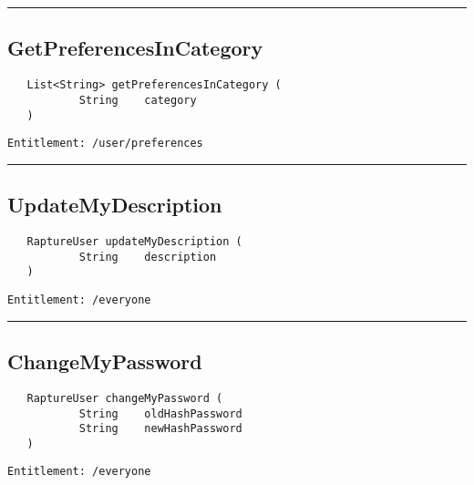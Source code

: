 \rule{12cm}{2pt}
\subsection{GetPreferencesInCategory}
\label{Api:GetPreferencesInCategory}
\begin{verbatim}
   List<String> getPreferencesInCategory (
           String    category
   )
\end{verbatim}
\begin{Verbatim}[fontsize=\small, formatcom=\color{Maroon}]
  Entitlement: /user/preferences
\end{Verbatim}



\rule{12cm}{2pt}
\subsection{UpdateMyDescription}
\label{Api:UpdateMyDescription}
\begin{verbatim}
   RaptureUser updateMyDescription (
           String    description
   )
\end{verbatim}
\begin{Verbatim}[fontsize=\small, formatcom=\color{Maroon}]
  Entitlement: /everyone
\end{Verbatim}



\rule{12cm}{2pt}
\subsection{ChangeMyPassword}
\label{Api:ChangeMyPassword}
\begin{verbatim}
   RaptureUser changeMyPassword (
           String    oldHashPassword
           String    newHashPassword
   )
\end{verbatim}
\begin{Verbatim}[fontsize=\small, formatcom=\color{Maroon}]
  Entitlement: /everyone
\end{Verbatim}



